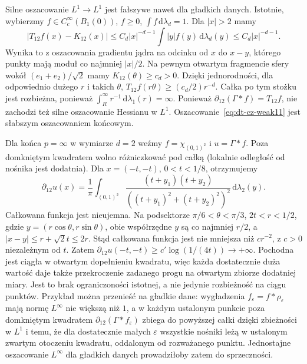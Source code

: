 \begin{uwaga}
\label{rem:dt-cz-endpoints}
Silne oszacowanie $L^1\to L^1$ jest fałszywe nawet
dla gładkich danych. Istotnie, wybierzmy
$f\in C_c^\infty(B_1(0))$, $f\ge0$, $\int f\,\mathrm d\lambda_d=1$.
Dla $|x|>2$ mamy
\[
 |T_{12}f(x)-K_{12}(x)|
 \le C_d|x|^{-d-1}\int |y|f(y)\,\mathrm d\lambda_d(y)
 \le C_d|x|^{-d-1}.
\]
Wynika to z oszacowania gradientu jądra na odcinku
od $x$ do $x-y$, którego punkty mają moduł co najmniej
$|x|/2$. Na pewnym otwartym fragmencie sfery wokół
$(e_1+e_2)/\sqrt2$ mamy $K_{12}(\theta)\ge c_d>0$.
Dzięki jednorodności, dla odpowiednio dużego $r$ i takich
$\theta$, $T_{12}f(r\theta)\ge(c_d/2)r^{-d}$.
Całka po tym stożku jest rozbieżna, ponieważ
$\int_R^\infty r^{-1}\,\mathrm d\lambda_1(r)=\infty$.
Ponieważ $\partial_{12}(\Gamma*f)=T_{12}f$,
nie zachodzi też silne oszacowanie Hessianu w $L^1$.
Oszacowanie~\eqref{eq:dt-cz-weak11} jest słabszym
oszacowaniem końcowym.

Dla końca $p=\infty$ w wymiarze $d=2$ weźmy
$f=\chi_{(0,1)^2}$ i $u=\Gamma*f$.
Poza domkniętym kwadratem wolno różniczkować pod całką
(lokalnie odległość od nośnika jest dodatnia).
Dla $x=(-t,-t)$, $0<t<1/8$, otrzymujemy
\[
 \partial_{12}u(x)=\frac1\pi
 \int_{(0,1)^2}
 \frac{(t+y_1)(t+y_2)}
 {((t+y_1)^2+(t+y_2)^2)^2}\,\mathrm d\lambda_2(y).
\]
Całkowana funkcja jest nieujemna. Na podsektorze
$\pi/6<\theta<\pi/3$, $2t<r<1/2$, gdzie
$y=(r\cos\theta,r\sin\theta)$, obie współrzędne $y$
są co najmniej $r/2$, a $|x-y|\le r+\sqrt2t\le2r$.
Stąd całkowana funkcja jest nie mniejsza niż $c r^{-2}$,
z $c>0$ niezależnym od $t$. Zatem
$\partial_{12}u(-t,-t)\ge c'\log(1/(4t))\to+\infty$.
Pochodna jest ciągła w otwartym dopełnieniu kwadratu,
więc każda dostatecznie duża wartość daje także
przekroczenie zadanego progu na otwartym zbiorze
dodatniej miary. Jest to brak ograniczoności istotnej,
a nie jedynie rozbieżność na ciągu punktów.
Przykład można przenieść na gładkie dane: wygładzenia
$f_\varepsilon=f*\rho_\varepsilon$ mają normę
$L^\infty$ nie większą niż $1$, a w każdym ustalonym
punkcie poza domkniętym kwadratem
$\partial_{12}(\Gamma*f_\varepsilon)$ zbiega
do powyższej całki dzięki zbieżności w $L^1$
i temu, że dla dostatecznie małych $\varepsilon$
wszystkie nośniki leżą w ustalonym zwartym otoczeniu
kwadratu, oddalonym od rozważanego punktu.
Jednostajne oszacowanie $L^\infty$ dla gładkich danych
prowadziłoby zatem do sprzeczności.
\end{uwaga}
